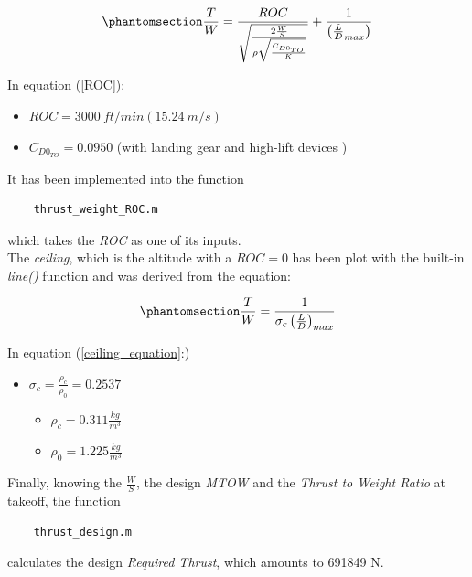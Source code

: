 \documentclass{article}
\begin{document}
\begin{equation}
    \phantomsection
    \label{ROC}
    \frac{T}{W} = \frac{ROC}{\sqrt{\frac{2\frac{W}{S}}{\rho \sqrt{\frac{C_{D0_{TO}}}{K}}}}} + \frac{1}{\left(\frac{L}{D}_{max}\right)}
\end{equation}

In equation (\ref{ROC}):

\begin{itemize}
    \item $ROC = 3000 \ ft/min (15.24 \ m/s)$ 
    \item $C_{D0_{TO}} = 0.0950$ (with landing gear and high-lift devices \autocite{Raymer_Daniel})
\end{itemize}

It has been implemented into the function

\begin{verbatim}
    thrust_weight_ROC.m
\end{verbatim}

which takes the \textit{ROC} as one of its inputs. \\ 

The \textit{ceiling}, which is the altitude with a $ROC = 0$ has been plot with the built-in 
\textit{line()} function and was derived from the equation:

\begin{equation}
    \phantomsection
    \label{ceiling_equation}
    \frac{T}{W} = \frac{1}{\sigma_c \left(\frac{L}{D}\right)_{max}}
\end{equation}

In equation (\ref{ceiling_equation}:)

\begin{itemize}
    \item $\sigma_c = \frac{\rho_c}{\rho_0} = 0.2537$
        \begin{itemize}
            \item $\rho_c = 0.311 \frac{kg}{m^3}$
            \item $\rho_0 = 1.225 \frac{kg}{m^3}$
        \end{itemize}
\end{itemize}

Finally, knowing the $\frac{W}{S}$, the design \textit{MTOW} and the \textit{Thrust to Weight Ratio} at takeoff, 
the function 
\begin{verbatim}
    thrust_design.m
\end{verbatim}

calculates the design \textit{Required Thrust}, which amounts to 691849 N.
\end{document}
